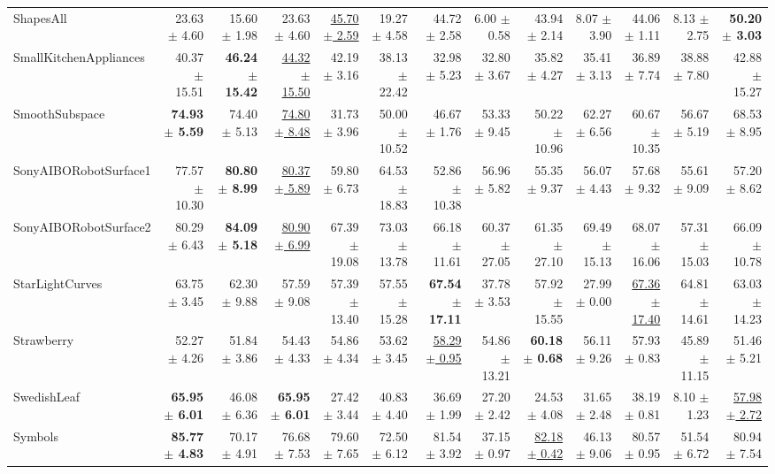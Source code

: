 \begin{landscape}
\begin{longtable}{lrrrrrrrrrrrr}
ShapesAll & 23.63 $\pm$ 4.60 & 15.60 $\pm$ 1.98 & 23.63 $\pm$ 4.60 & \underline{45.70 $\pm$ 2.59} & 19.27 $\pm$ 4.58 & 44.72 $\pm$ 2.58 & 6.00 $\pm$ 0.58 & 43.94 $\pm$ 2.14 & 8.07 $\pm$ 3.90 & 44.06 $\pm$ 1.11 & 8.13 $\pm$ 2.75 & \textbf{50.20 $\pm$ 3.03} \\
SmallKitchenAppliances & 40.37 $\pm$ 15.51 & \textbf{46.24 $\pm$ 15.42} & \underline{44.32 $\pm$ 15.50} & 42.19 $\pm$ 3.16 & 38.13 $\pm$ 22.42 & 32.98 $\pm$ 5.23 & 32.80 $\pm$ 3.67 & 35.82 $\pm$ 4.27 & 35.41 $\pm$ 3.13 & 36.89 $\pm$ 7.74 & 38.88 $\pm$ 7.80 & 42.88 $\pm$ 15.27 \\
SmoothSubspace & \textbf{74.93 $\pm$ 5.59} & 74.40 $\pm$ 5.13 & \underline{74.80 $\pm$ 8.48} & 31.73 $\pm$ 3.96 & 50.00 $\pm$ 10.52 & 46.67 $\pm$ 1.76 & 53.33 $\pm$ 9.45 & 50.22 $\pm$ 10.96 & 62.27 $\pm$ 6.56 & 60.67 $\pm$ 10.35 & 56.67 $\pm$ 5.19 & 68.53 $\pm$ 8.95 \\
SonyAIBORobotSurface1 & 77.57 $\pm$ 10.30 & \textbf{80.80 $\pm$ 8.99} & \underline{80.37 $\pm$ 5.89} & 59.80 $\pm$ 6.73 & 64.53 $\pm$ 18.83 & 52.86 $\pm$ 10.38 & 56.96 $\pm$ 5.82 & 55.35 $\pm$ 9.37 & 56.07 $\pm$ 4.43 & 57.68 $\pm$ 9.32 & 55.61 $\pm$ 9.09 & 57.20 $\pm$ 8.62 \\
SonyAIBORobotSurface2 & 80.29 $\pm$ 6.43 & \textbf{84.09 $\pm$ 5.18} & \underline{80.90 $\pm$ 6.99} & 67.39 $\pm$ 19.08 & 73.03 $\pm$ 13.78 & 66.18 $\pm$ 11.61 & 60.37 $\pm$ 27.05 & 61.35 $\pm$ 27.10 & 69.49 $\pm$ 15.13 & 68.07 $\pm$ 16.06 & 57.31 $\pm$ 15.03 & 66.09 $\pm$ 10.78 \\
StarLightCurves & 63.75 $\pm$ 3.45 & 62.30 $\pm$ 9.88 & 57.59 $\pm$ 9.08 & 57.39 $\pm$ 13.40 & 57.55 $\pm$ 15.28 & \textbf{67.54 $\pm$ 17.11} & 37.78 $\pm$ 3.53 & 57.92 $\pm$ 15.55 & 27.99 $\pm$ 0.00 & \underline{67.36 $\pm$ 17.40} & 64.81 $\pm$ 14.61 & 63.03 $\pm$ 14.23 \\
Strawberry & 52.27 $\pm$ 4.26 & 51.84 $\pm$ 3.86 & 54.43 $\pm$ 4.33 & 54.86 $\pm$ 4.34 & 53.62 $\pm$ 3.45 & \underline{58.29 $\pm$ 0.95} & 54.86 $\pm$ 13.21 & \textbf{60.18 $\pm$ 0.68} & 56.11 $\pm$ 9.26 & 57.93 $\pm$ 0.83 & 45.89 $\pm$ 11.15 & 51.46 $\pm$ 5.21 \\
SwedishLeaf & \textbf{65.95 $\pm$ 6.01} & 46.08 $\pm$ 6.36 & \textbf{65.95 $\pm$ 6.01} & 27.42 $\pm$ 3.44 & 40.83 $\pm$ 4.40 & 36.69 $\pm$ 1.99 & 27.20 $\pm$ 2.42 & 24.53 $\pm$ 4.08 & 31.65 $\pm$ 2.48 & 38.19 $\pm$ 0.81 & 8.10 $\pm$ 1.23 & \underline{57.98 $\pm$ 2.72} \\
Symbols & \textbf{85.77 $\pm$ 4.83} & 70.17 $\pm$ 4.91 & 76.68 $\pm$ 7.53 & 79.60 $\pm$ 7.65 & 72.50 $\pm$ 6.12 & 81.54 $\pm$ 3.92 & 37.15 $\pm$ 0.97 & \underline{82.18 $\pm$ 0.42} & 46.13 $\pm$ 9.06 & 80.57 $\pm$ 0.95 & 51.54 $\pm$ 6.72 & 80.94 $\pm$ 7.54 \\

\end{longtable}
\end{landscape}
